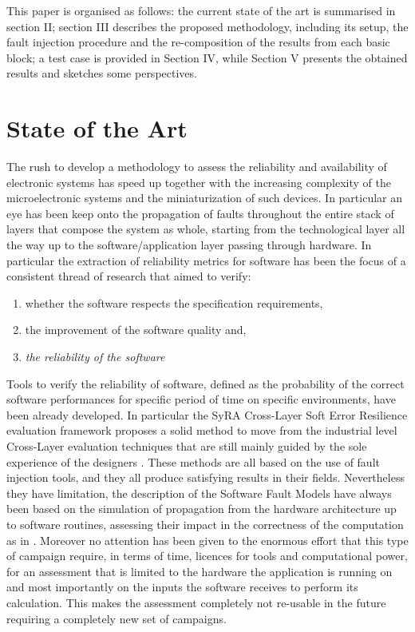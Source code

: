 \documentclass[./dissertation.tex]{subfiles}
\begin{document}
This paper is organised as follows: the current state of the art is summarised in section II; section III describes the proposed methodology, including its setup, the fault injection procedure and the re-composition of the results from each basic block; a test case is provided in Section IV, while Section V presents the obtained results and sketches some perspectives.
%
%
\section{State of the Art}
The rush to develop a methodology to assess the reliability and availability of electronic systems has speed up together with the increasing complexity of the microelectronic systems and the miniaturization of such devices. In particular an eye has been keep onto the propagation of faults throughout the entire stack of layers that compose the system as whole, starting from the technological layer all the way up to the software/application layer passing through hardware. 
In particular the extraction of reliability metrics for software has been the focus of a consistent thread of research \cite{kooli:lirmm-01693156}\cite{6850649}\cite{Vallero20151204} that aimed to verify:
\begin{enumerate}
    \item whether the software respects the specification requirements,
    \item the improvement of the software quality and, 
    \item \textit{the reliability of the software}
\end{enumerate}

Tools to verify the reliability of software, defined as the probability of the correct software performances for specific period of time on specific environments, have been already developed. In particular the SyRA \cite{8580414} Cross-Layer Soft Error Resilience evaluation framework proposes a solid method to move from the industrial level Cross-Layer evaluation techniques that are still mainly guided by the sole experience of the designers \cite{7544311}. These methods are all based on the use of fault injection tools, and they all produce satisfying results in their fields. Nevertheless they have limitation, the description of the Software Fault Models have always been based on the simulation of propagation from the hardware architecture up to software routines, assessing their impact in the correctness of the computation as in \cite{10.5555/1628854}\cite{1673379}\cite{1181740}. Moreover no attention has been given to the enormous effort that this type of campaign require, in terms of time, licences for tools and computational power, for an assessment that is limited to the hardware the application is running on and most importantly on the inputs the software receives to perform its calculation. This makes the assessment completely not re-usable in the future requiring a completely new set of campaigns.
\end{document}
